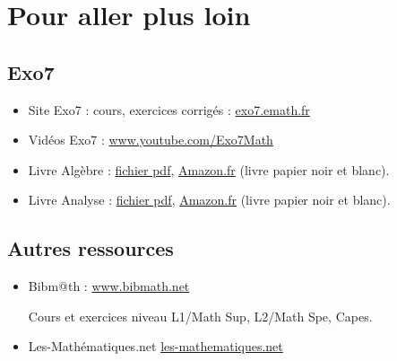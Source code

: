 
\section*{Pour aller plus loin}


\begin{multicols}{2}

\subsection*{Exo7}

\begin{itemize}
	\item Site Exo7 : cours, exercices corrigés : 
	\href{http://exo7.emath.fr/}
    {exo7.emath.fr}
    
    \item Vidéos Exo7 :
    \href{https://www.youtube.com/Exo7Math}
    {www.youtube.com/Exo7Math}
    
    \item Livre \og{}Algèbre\fg{} :    
    \href{http://exo7.emath.fr/cours/livre-algebre-1.pdf}{fichier pdf},    
    \href{https://www.amazon.fr/dp/1517683637}{Amazon.fr} (livre papier noir et blanc).

    \item Livre \og{}Analyse\fg{} :
	\href{http://exo7.emath.fr/cours/livre-analyse-1.pdf}{fichier pdf},
	\href{https://www.amazon.fr/dp/1522821643}{Amazon.fr} (livre papier noir et blanc).
  
\end{itemize}


\subsection*{Autres ressources}


\begin{itemize}
		
	\item \og{}Bibm@th\fg{} : \href{https://www.bibmath.net/}{www.bibmath.net}
	
	Cours et exercices niveau L1/Math Sup, L2/Math Spe, Capes.
	
	\item \og{}Les-Mathématiques.net\fg{}
	\href{https://les-mathematiques.net/}{les-mathematiques.net}
	

\end{itemize}
\end{multicols}
